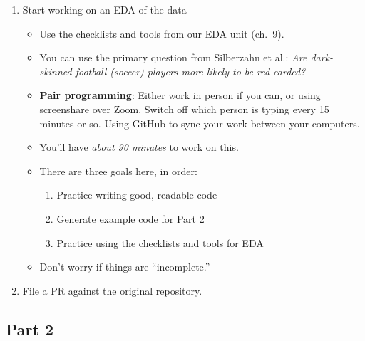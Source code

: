 \documentclass[
]{article}
\providecommand{\tightlist}{%
  \setlength{\itemsep}{0pt}\setlength{\parskip}{0pt}}
\begin{document}
\begin{enumerate}
\def\labelenumi{\arabic{enumi}.}
\setcounter{enumi}{1}
\tightlist
\item
  Start working on an EDA of the data

  \begin{itemize}
  \tightlist
  \item
    Use the checklists and tools from our EDA unit (ch.~9).
  \item
    You can use the primary question from Silberzahn et al.: \emph{Are dark-skinned football (soccer) players more likely to be red-carded?}
  \item
    \textbf{Pair programming}: Either work in person if you can, or using screenshare over Zoom. Switch off which person is typing every 15 minutes or so. Using GitHub to sync your work between your computers.
  \item
    You'll have \emph{about 90 minutes} to work on this.
  \item
    There are three goals here, in order:

    \begin{enumerate}
    \def\labelenumii{\arabic{enumii}.}
    \tightlist
    \item
      Practice writing good, readable code
    \item
      Generate example code for Part 2
    \item
      Practice using the checklists and tools for EDA
    \end{enumerate}
  \item
    Don't worry if things are ``incomplete.''
  \end{itemize}
\item
  File a PR against the original repository.
\end{enumerate}

\hypertarget{part-2}{%
\subsection{Part 2}\label{part-2}}
\end{document}
